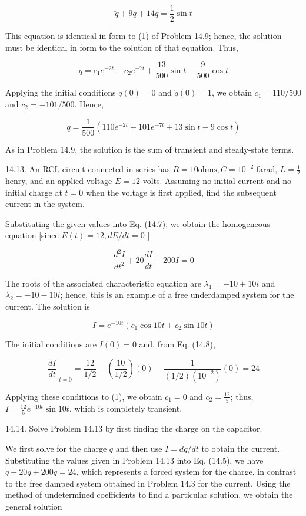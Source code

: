 \documentclass[10pt]{article}
\begin{document}
$$
\ddot{q}+9 \dot{q}+14 q=\frac{1}{2} \sin t
$$

This equation is identical in form to (1) of Problem 14.9; hence, the solution must be identical in form to the solution of that equation. Thus,

$$
q=c_{1} e^{-2 t}+c_{2} e^{-7 t}+\frac{13}{500} \sin t-\frac{9}{500} \cos t
$$

Applying the initial conditions $q(0)=0$ and $\dot{q}(0)=1$, we obtain $c_{1}=110 / 500$ and $c_{2}=-101 / 500$. Hence,

$$
q=\frac{1}{500}\left(110 e^{-2 t}-101 e^{-7 t}+13 \sin t-9 \cos t\right)
$$

As in Problem 14.9, the solution is the sum of transient and steady-state terms.

14.13. An RCL circuit connected in series has $R=10 \mathrm{ohms}, C=10^{-2}$ farad, $L=\frac{1}{2}$ henry, and an applied voltage $E=12$ volts. Assuming no initial current and no initial charge at $t=0$ when the voltage is first applied, find the subsequent current in the system.

Substituting the given values into Eq. (14.7), we obtain the homogeneous equation [since $E(t)=12, d E / d t=0$ ]

$$
\frac{d^{2} I}{d t^{2}}+20 \frac{d I}{d t}+200 I=0
$$

The roots of the associated characteristic equation are $\lambda_{1}=-10+10 i$ and $\lambda_{2}=-10-10 i$; hence, this is an example of a free underdamped system for the current. The solution is


\begin{equation*}
I=e^{-10 t}\left(c_{1} \cos 10 t+c_{2} \sin 10 t\right) \tag{1}
\end{equation*}


The initial conditions are $I(0)=0$ and, from Eq. (14.8),

$$
\left.\frac{d I}{d t}\right|_{t=0}=\frac{12}{1 / 2}-\left(\frac{10}{1 / 2}\right)(0)-\frac{1}{(1 / 2)\left(10^{-2}\right)}(0)=24
$$

Applying these conditions to (1), we obtain $c_{1}=0$ and $c_{2}=\frac{12}{5}$; thus, $I=\frac{12}{5} e^{-10 t} \sin 10 t$, which is completely transient.

14.14. Solve Problem 14.13 by first finding the charge on the capacitor.

We first solve for the charge $q$ and then use $I=d q / d t$ to obtain the current. Substituting the values given in Problem 14.13 into Eq. (14.5), we have $\ddot{q}+20 \dot{q}+200 q=24$, which represents a forced system for the charge, in contrast to the free damped system obtained in Problem 14.3 for the current. Using the method of undetermined coefficients to find a particular solution, we obtain the general solution
\end{document}
